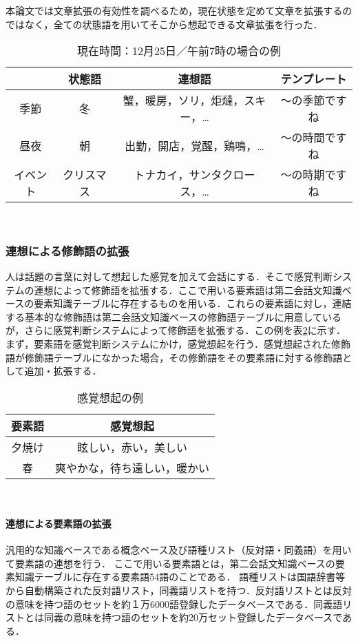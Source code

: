 本論文では文章拡張の有効性を調べるため，現在状態を定めて文章を拡張するのではなく，全ての状態語を用いてそこから想起できる文章拡張を行った．
\begin{table}[htbp]
	\caption{現在時間：12月25日／午前7時の場合の例}
	\begin{center}
		\begin{tabular}{|c|c|c|c|}
		\hline
		 & 状態語 & 連想語 & テンプレート \\ \hline
		季節 & 冬 & 蟹，暖房，ソリ，炬燵，スキー，… & 〜の季節ですね \\ \hline
		昼夜 & 朝 & 出勤，開店，覚醒，鶏鳴，… & 〜の時間ですね \\ \hline
		イベント & クリスマス & トナカイ，サンタクロース，… & 〜の時期ですね \\ \hline
		\end{tabular}
	\end{center}
	\label{tb:timekakucho}
\end{table}

\\
\subsubsection{連想による修飾語の拡張}
人は話題の言葉に対して想起した感覚を加えて会話にする．そこで感覚判断システムの連想によって修飾語を拡張する．ここで用いる要素語は第二会話文知識ベースの要素知識テーブルに存在するものを用いる．これらの要素語に対し，連結する基本的な修飾語は第二会話文知識ベースの修飾語テーブルに用意しているが，さらに感覚判断システムによって修飾語を拡張する．この例を表\ref{tb:kankakukakucho}に示す．
まず，要素語を感覚判断システムにかけ，感覚想起を行う．感覚想起された修飾語が修飾語テーブルになかった場合，その修飾語をその要素語に対する修飾語として追加・拡張する．
\begin{table}[htbp]
	\caption{感覚想起の例}
	\begin{center}
		\begin{tabular}{c|c}
		\hline
		要素語 & 感覚想起 \\ \hline
		夕焼け & 眩しい，赤い，美しい \\ \hline
		春 & 爽やかな，待ち遠しい，暖かい \\ \hline
		\end{tabular}
	\end{center}
	\label{tb:kankakukakucho}
\end{table}
\\
\paragraph{連想による要素語の拡張}
汎用的な知識ベースである概念ベース及び語種リスト（反対語・同義語）を用いて要素語の連想を行う．
ここで用いる要素語とは，第二会話文知識ベースの要素知識テーブルに存在する要素語54語のことである．
語種リストは国語辞書等から自動構築された反対語リスト，同義語リストを持つ．反対語リストとは反対の意味を持つ語のセットを約１万6000語登録したデータベースである．同義語リストとは同義の意味を持つ語のセットを約20万セット登録したデータベースである．

